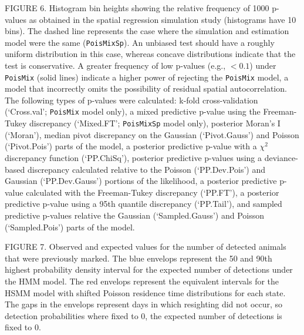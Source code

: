 \documentclass[12pt,english]{article}
\begin{document}
\begin{spacing}{1.9}
    FIGURE 6.  Histogram bin heights showing the relative frequency of
    1000 p-values as obtained in the spatial regression simulation
    study (histograms have 10 bins).  The dashed line represents the
    case where the simulation and estimation model were the same
    (\texttt{PoisMixSp}).  An unbiased test should have a roughly
    uniform distribution in this case, whereas concave distributions
    indicate that the test is conservative.  A greater frequency of
    low p-values (e.g., $<0.1$) under \texttt{PoisMix} (solid lines)
    indicate a higher power of rejecting the \texttt{PoisMix} model, a
    model that incorrectly omits the possibility of residual spatial
    autocorrelation.  The following types of p-values were calculated:
    k-fold cross-validation (`Cross.val'; \texttt{PoisMix} model
    only), a mixed predictive p-value using the Freeman-Tukey
    discrepancy (`Mixed.FT'; \texttt{PoisMixSp} model only), posterior
    Moran's I (`Moran'), median pivot discrepancy on the Gaussian
    (`Pivot.Gauss') and Poisson (`Pivot.Pois') parts of the model, a
    posterior predictive p-value with a $\chi^2$ discrepancy function
    (`PP.ChiSq'), posterior predictive p-values using a deviance-based
    discrepancy calculated relative to the Poisson (`PP.Dev.Pois') and
    Gaussian (`PP.Dev.Gauss') portions of the likelihood, a posterior
    predictive p-value calculated with the Freeman-Tukey discrepancy
    (`PP.FT'), a posterior predictive p-value using a 95th quantile
    discrepancy (`PP.Tail'), and sampled predictive p-values relative
    the Gaussian (`Sampled.Gauss') and Poisson (`Sampled.Pois') parts
    of the model.
    
    FIGURE 7. Observed and expected values for the number of detected animals that were previously marked. The blue envelops represent the 50 and 90th highest probability density interval for the expected number of detections under the HMM model. The red envelops represent the equivalent intervals for the HSMM model with shifted Poisson residence time distributions for each state. The gaps in the envelops represent days in which resighting did not occur, so detection probabilities where fixed to 0, the expected number of detections is fixed to 0.


    \pagebreak


\end{spacing}
\end{document}

